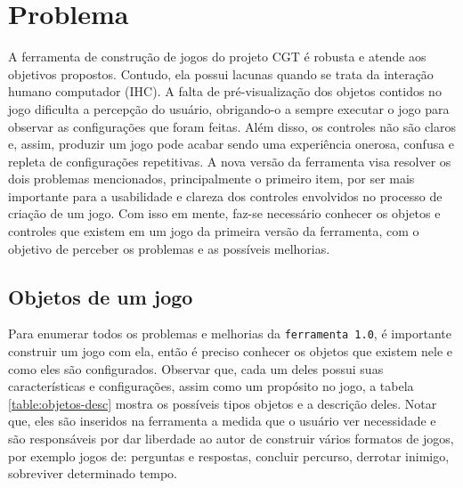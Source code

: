 \documentclass[12pt,oneside,openright,a4paper,english,brazil,sumario=tradicional]{abntex2}
\begin{document}
\chapter{Problema}
\label{chap:problemas}
A ferramenta de construção de jogos do projeto CGT é robusta e atende aos objetivos propostos. Contudo, ela possui lacunas quando se trata da interação humano computador (IHC).
A falta de pré-visualização dos objetos contidos no jogo dificulta a percepção do usuário, obrigando-o a sempre executar o jogo para observar as configurações que foram feitas.
Além disso, os controles não são claros e, assim, produzir um jogo pode acabar sendo uma experiência onerosa, confusa e repleta de configurações repetitivas.
A nova versão da ferramenta visa resolver os dois problemas mencionados, principalmente o primeiro item, por ser mais importante para a usabilidade e clareza dos controles envolvidos no processo de criação de um jogo.
Com isso em mente, faz-se necessário conhecer os objetos e controles que existem em um jogo da primeira versão da ferramenta, com o objetivo de perceber os problemas e as possíveis melhorias.

\section{Objetos de um jogo}
\label{sec:objetos}

Para enumerar todos os problemas e melhorias da \texttt{ferramenta 1.0}, é importante construir um jogo com ela, então é preciso conhecer os objetos que existem nele e como eles são configurados. Observar que, cada um deles possui suas características e configurações, assim como um propósito no jogo, a tabela \ref{table:objetos-desc} mostra os possíveis tipos objetos e a descrição deles. Notar que, eles são inseridos na ferramenta a medida que o usuário ver necessidade e são responsáveis por dar liberdade ao autor de construir vários formatos de jogos, por exemplo jogos de: perguntas e respostas, concluir percurso, derrotar inimigo, sobreviver determinado tempo.
\end{document}
